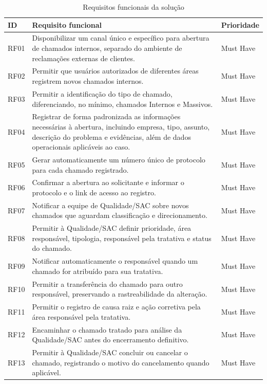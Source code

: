 \begin{table}[H]
\caption{Requisitos funcionais da solução}
\label{tab:requisitos-funcionais}
\centering
\begin{tabular}{p{1.0cm} p{8.7cm} p{2.3cm}}
\hline
\textbf{ID} & \textbf{Requisito funcional} &
\textbf{Prioridade} \\
\hline
RF01 & Disponibilizar um canal único e específico para
abertura de chamados internos, separado do ambiente de
reclamações externas de clientes. & Must Have \\
\hline
RF02 & Permitir que usuários autorizados de diferentes
áreas registrem novos chamados internos. & Must Have \\
\hline
RF03 & Permitir a identificação do tipo de chamado,
diferenciando, no mínimo, chamados Internos e Massivos. &
Must Have \\
\hline
RF04 & Registrar de forma padronizada as informações
necessárias à abertura, incluindo empresa, tipo, assunto,
descrição do problema e evidências, além de dados
operacionais aplicáveis ao caso. & Must Have \\
\hline
RF05 & Gerar automaticamente um número único de protocolo
para cada chamado registrado. & Must Have \\
\hline
RF06 & Confirmar a abertura ao solicitante e informar o
protocolo e o link de acesso ao registro. & Must Have \\
\hline
RF07 & Notificar a equipe de Qualidade/SAC sobre novos
chamados que aguardam classificação e direcionamento. &
Must Have \\
\hline
RF08 & Permitir à Qualidade/SAC definir prioridade, área
responsável, tipologia, responsável pela tratativa e status
do chamado. & Must Have \\
\hline
RF09 & Notificar automaticamente o responsável quando um
chamado for atribuído para sua tratativa. & Must Have \\
\hline
RF10 & Permitir a transferência do chamado para outro
responsável, preservando a rastreabilidade da alteração. &
Must Have \\
\hline
RF11 & Permitir o registro de causa raiz e ação corretiva
pela área responsável pela tratativa. & Must Have \\
\hline
RF12 & Encaminhar o chamado tratado para análise da
Qualidade/SAC antes do encerramento definitivo. &
Must Have \\
\hline
RF13 & Permitir à Qualidade/SAC concluir ou cancelar o
chamado, registrando o motivo do cancelamento quando
aplicável. & Must Have \\

\end{tabular}
\end{table}

